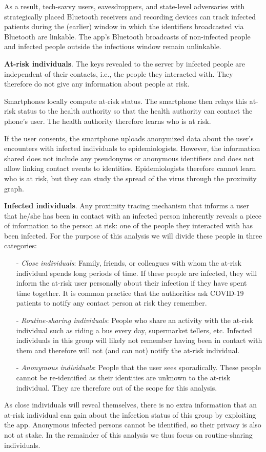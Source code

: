 \documentclass[10.8pt,a4paper]{article}
\begin{document}
As a result, tech-savvy users, eavesdroppers, and state-level adversaries with strategically placed Bluetooth receivers and recording devices can track infected patients during the (earlier) window in which the identifiers broadcasted via Bluetooth are linkable. The app’s Bluetooth broadcasts of non-infected people and infected people outside the infectious window remain unlinkable.

\textbf{At-risk individuals}. The keys revealed to the server by infected people are independent of their contacts, i.e., the people they interacted with. They therefore do not give any information about people at risk.

Smartphones locally compute at-risk status. The smartphone then relays this at-risk status to the health authority so that the health authority can contact the phone’s user. The health authority therefore learns who is at risk.

If the user consents, the smartphone uploads anonymized data about the user’s encounters
with infected individuals to epidemiologists. However, the information shared does not
include any pseudonyms or anonymous identifiers and does not allow linking contact events
to identities. Epidemiologists therefore cannot learn who is at risk, but they can study the spread of the virus through the proximity graph.

\textbf{Infected individuals}. Any proximity tracing mechanism that informs a user that he/she has been in contact with an infected person inherently reveals a piece of information to the person at risk: one of the people they interacted with has been infected. For the purpose of this analysis we will divide these people in three categories: 
\begin{itemize}\itemsep0pt
\item[-] \textit{Close individuals}: Family, friends, or colleagues with whom the at-risk individual spends long periods of time. If these people are infected, they will inform the at-risk user personally about their infection if they have spent time together. It is common practice that the authorities ask COVID-19 patients to notify any contact person at
risk they remember.
\item[-] \textit{Routine-sharing individuals}: People who share an activity with the at-risk individual such as riding a bus every day, supermarket tellers, etc. Infected individuals in this group will likely not remember having been in contact with them and therefore will not (and can not) notify the at-risk individual.
\item[-] \textit{Anonymous individuals}: People that the user sees sporadically. These people cannot be re-identified as their identities are unknown to the at-risk individual. They are therefore out of the scope for this analysis.
\end{itemize}
As close individuals will reveal themselves, there is no extra information that an at-risk
individual can gain about the infection status of this group by exploiting the app. Anonymous infected persons cannot be identified, so their privacy is also not at stake. In the remainder of this analysis we thus focus on routine-sharing individuals.
\end{document}
